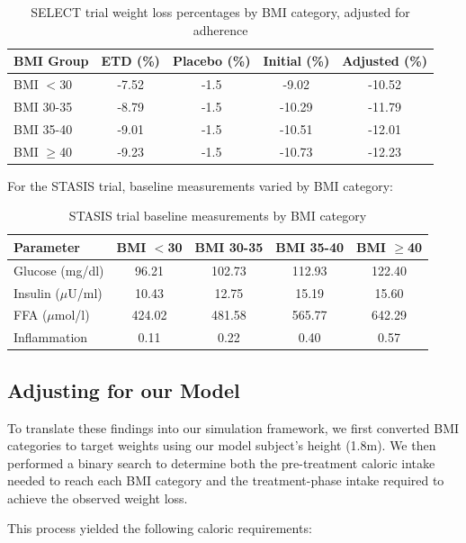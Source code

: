 \begin{table}[h]
\centering
\begin{tabular}{|l|c|c|c|c|}
\hline
\textbf{BMI Group} & \textbf{ETD (\%)} & \textbf{Placebo (\%)} & \textbf{Initial (\%)} & \textbf{Adjusted (\%)} \\
\hline
BMI $<$30 & -7.52 & -1.5 & -9.02 & -10.52 \\
BMI 30-35 & -8.79 & -1.5 & -10.29 & -11.79 \\
BMI 35-40 & -9.01 & -1.5 & -10.51 & -12.01 \\
BMI $\geq$40 & -9.23 & -1.5 & -10.73 & -12.23 \\
\hline
\end{tabular}
\caption{SELECT trial weight loss percentages by BMI category, adjusted for adherence}
\end{table}

For the STASIS trial, baseline measurements varied by BMI category:

\begin{table}[h]
\centering
\begin{tabular}{|l|c|c|c|c|}
\hline
\textbf{Parameter} & \textbf{BMI $<$30} & \textbf{BMI 30-35} & \textbf{BMI 35-40} & \textbf{BMI $\geq$40} \\
\hline
Glucose (mg/dl) & 96.21 & 102.73 & 112.93 & 122.40 \\
Insulin ($\mu$U/ml) & 10.43 & 12.75 & 15.19 & 15.60 \\
FFA ($\mu$mol/l) & 424.02 & 481.58 & 565.77 & 642.29 \\
Inflammation & 0.11 & 0.22 & 0.40 & 0.57 \\
\hline
\end{tabular}
\caption{STASIS trial baseline measurements by BMI category}
\end{table}

\subsection{Adjusting for our Model}
To translate these findings into our simulation framework, we first converted BMI categories to target weights using our model subject's height (1.8m). We then performed a binary search to determine both the pre-treatment caloric intake needed to reach each BMI category and the treatment-phase intake required to achieve the observed weight loss.

This process yielded the following caloric requirements:

